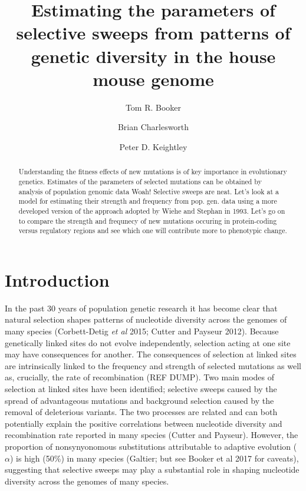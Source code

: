 \documentclass[11pt]{article}
\title{\textbf{Estimating the parameters of selective sweeps from patterns of genetic diversity in the house mouse genome}}
\author[1,*]{Tom R. Booker}
\author[1]{Brian Charlesworth}
\author[1]{Peter D. Keightley}
\affil[1]{Institute of Evolutionary Biology, University of Edinburgh, Edinburgh}
\affil[*]{\emph{t.r.booker@sms.ed.ac.uk}}
\begin{document}
\maketitle
\begin{abstract}
Understanding the fitness effects of new mutations is of key importance in evolutionary genetics. 
Estimates of the parameters of selected mutations can be obtained by analysis of population genomic data
Woah! Selective sweeps are neat. Let's look at a model for estimating their strength and frequency from pop. gen. data using a more developed version of the approach adopted by Wiehe and Stephan in 1993. Let's go on to compare the strength and frequnecy of new mutations occuring in protein-coding versus regulatory regions and see which one will contribute more to phenotypic change.

\end{abstract}

\section*{Introduction}

In the past 30 years of population genetic research it has become clear that natural selection shapes patterns of nucleotide diversity across the genomes of many species (Corbett-Detig \textit{et al} 2015; Cutter and Payseur 2012). Because genetically linked sites do not evolve independently, selection acting at one site may have consequences for another. The consequences of selection at linked sites are intrinsically linked to the frequency and strength of selected mutations as well as, crucially, the rate of recombination (REF DUMP). Two main modes of selection at linked sites have been identified; selective sweeps caused by the spread of advantageous mutations and background selection caused by the removal of deleterious variants. The two processes are related and can both potentially explain the positive correlations between nucleotide diversity and recombination rate reported in many species (Cutter and Payseur). However, the proportion of nonsynyonomous substitutions attributable to adaptive evolution ($\alpha$) is  high (50\%) in many species (Galtier; but see Booker et al 2017 for caveats), suggesting that selective sweeps may play a substantial role in shaping nucleotide diversity across the genomes of many species.
\end{document}

